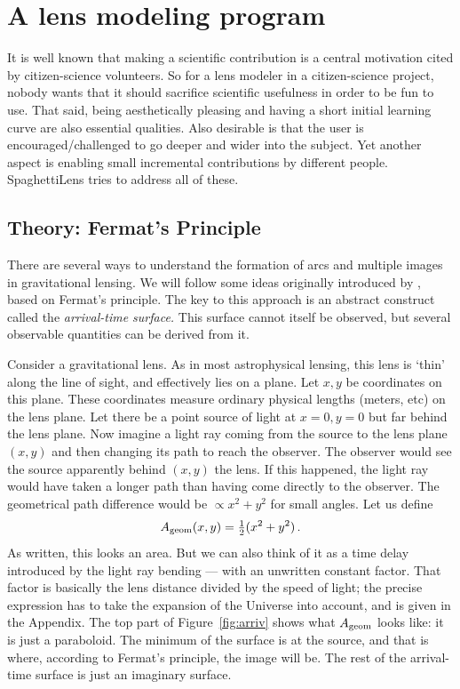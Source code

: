 \documentclass[12pt,preprint]{aastex}
\def\half{{\textstyle\frac12}}
\newcommand{\spl}{SpaghettiLens\xspace}
\newcommand{\figref}[1]{Figure~\ref{fig:#1}}
\begin{document}
\section{A lens modeling program}

It is well known that making a scientific contribution is a central
motivation cited by citizen-science volunteers.  So for a lens
modeler in a citizen-science project, nobody wants that it should
sacrifice scientific usefulness in order to be fun to use.  That said,
being aesthetically pleasing and having a short initial learning curve
are also essential qualities.  Also desirable is that the user is
encouraged/challenged to go deeper and wider into the subject.
Yet another aspect is enabling small incremental contributions
by different people.  \spl tries to address all of these.

\subsection{Theory: Fermat's Principle} \label{sec:Fermat}

There are several ways to understand the formation of arcs and
multiple images in gravitational lensing.  We will follow some ideas
originally introduced by \cite{1986ApJ...310..568B}, based on Fermat's
principle.  The key to this approach is an abstract construct called
the {\em arrival-time surface.}  This surface cannot itself be
observed, but several observable quantities can be derived from it.

Consider a gravitational lens.  As in most astrophysical lensing, this
lens is `thin' along the line of sight, and effectively lies on a
plane.  Let $x,y$ be coordinates on this plane.  These coordinates
measure ordinary physical lengths (meters, etc) on the lens plane.
Let there be a point source of light at $x=0,y=0$ but far behind the
lens plane.  Now imagine a light ray coming from the source to the
lens plane $(x,y)$ and then changing its path to reach the observer.
The observer would see the source apparently behind $(x,y)$ the
lens.  If this happened, the light ray would have taken a longer path
than having come directly to the observer.  The geometrical path
difference would be $\propto x^2 + y^2$ for small angles.  Let us
define
\begin{equation} \label{eq:Ageom}
A_{\rm geom}(x,y) = \half(x^2 + y^2) \,.
\end{equation}
As written, this looks an area.  But we can also think of it as a
time delay introduced by the light ray bending --- with an unwritten
constant factor.  That factor is basically the lens distance divided by the
speed of light; the precise expression has to take the expansion of
the Universe into account, and is given in the Appendix.  The top part
of \figref{arriv} shows what $A_{\rm geom}$ looks like: it is
just a paraboloid.  The minimum of the surface is at the source, and
that is where, according to Fermat's principle, the image will be.
The rest of the arrival-time surface is just an imaginary surface.
\end{document}
